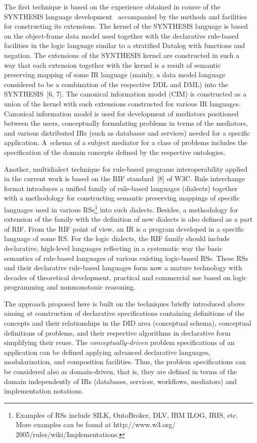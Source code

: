 \begin{multicols}{2}
  The first technique is based on the experience obtained in course of the
SYNTHESIS language development~\cite{4-kal, 5-kal} accompanied by the methods and
facilities for constructing its extensions. The kernel of the SYNTHESIS language is
based on the object-frame data model used together with the declarative rule-based
facilities in the logic language similar to a stratified Datalog with functions and
negation. The extensions of the SYNTHESIS kernel are constructed in such a way
that each extension together with the kernel is a result of semantic preserving
mapping of some IR language (mainly, a data model language considered to be a
combination of the respective DDL and DML) into the SYNTHESIS~[6, 7]. The
canonical information model (CIM) is constructed as a union of the kernel with such
extensions constructed for various IR languages. Canonical information model
is used for development of
mediators positioned between the users, conceptually formulating problems in terms
of the mediators, and various distributed IRs (such as databases and services) needed
for a specific application. A~schema of a subject mediator for a class of problems
includes the specification of the domain concepts defined by the respective
ontologies.

Another, multidialect technique for rule-based programs interoperability applied in the current
work is based on the RIF  standard~[8] of W3C. Rule interchange format introduces a
unified family of rule-based languages (dialects) together with a methodology for
constructing semantic preserving mappings of specific languages used in various
 RSs\footnote{Examples of RSs include SILK, OntoBroker, DLV, IBM ILOG,
IRIS, etc. More examples can be found at {\sf
http://www.w3.org/ 2005/rules/wiki/Implementations}.} into such dialects. Besides,
a methodology for extension of the family with the definition of new dialects is also defined
as a part of RIF. From the RIF point of view, an IR is a program developed in a specific
language of some RS. For the logic dialects, the RIF family should include declarative,
high-level languages reflecting in a systematic way the basic semantics of rule-based languages
of various existing logic-based RSs. These RSs and their declarative rule-based languages
form now a mature technology with decades of theoretical development, practical and
commercial use based on logic programming and nonmonotonic reasoning.

  The approach proposed here is built on the techniques briefly introduced above
aiming at construction of declarative specifications containing definitions of the
concepts and their relationships in the DID area (conceptual schema), conceptual
definitions of problems, and their respective algorithms in declarative form
simplifying their reuse. The \textit{conceptually-driven} problem specifications of an
application can be defined applying advanced declarative languages, modularization,
and composition facilities. Thus, the problem specifications can be considered also as
domain-driven, that is, they are defined in terms of the domain independently of
IRs (databases, services, workflows, mediators) and
implementation notations.


\end{multicols}
